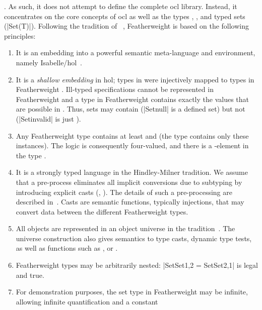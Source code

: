 . As such, it does not attempt to define the complete
\acs{ocl} library. Instead, it concentrates on the core concepts of
\acs{ocl} as well as the types ,
, and typed sets (\inlineocl|Set(T)|).  Following
the tradition of
\holocl~\cite{brucker.ea:hol-ocl:2008,brucker.ea:hol-ocl-book:2006},
Featherweight \OCL is based on the following principles:
\begin{enumerate}
\item It is an embedding into a powerful semantic meta-language and
  environment, namely
  Isabelle/\acs{hol}~\cite{nipkow.ea:isabelle:2002}.
\item It is a \emph{shallow embedding} in \acs{hol}; types
  in \OCL were injectively mapped to types in Featherweight
  \OCL. Ill-typed \OCL specifications cannot be represented in
  Featherweight \OCL and a type in Featherweight \OCL contains exactly
  the values that are possible in \OCL. Thus, sets may contain
   (\inlineocl|Set{null}| is a defined set) but not
   (\inlineocl|Set{invalid}| is just
  ).
\item Any Featherweight \OCL type contains at least
   and  (the type 
  contains only these instances). The logic is consequently
  four-valued, and there is a -element in the type
  .
\item It is a strongly typed language in the Hindley-Milner tradition.
  We assume that a pre-process eliminates all implicit conversions due
  to subtyping by introducing explicit casts (\eg,
  ). The details of such a pre-processing are
  described in~\cite{brucker:interactive:2007}.  Casts are semantic
  functions, typically injections, that may convert data between the
  different Featherweight \OCL types.
\item All objects are represented in an object universe in the \holocl
  tradition~\cite{brucker.ea:extensible:2008-b}. The universe
  construction also gives semantics to type casts, dynamic type
  tests, as well as functions such as ,
  or .
\item Featherweight \OCL types may be arbitrarily nested:
  \inlineocl|Set{Set{1,2}} = Set{Set{2,1}}| is legal and true.
\item For demonstration purposes, the set type in Featherweight \OCL
  may be infinite, allowing infinite quantification and a constant

\end{enumerate}
